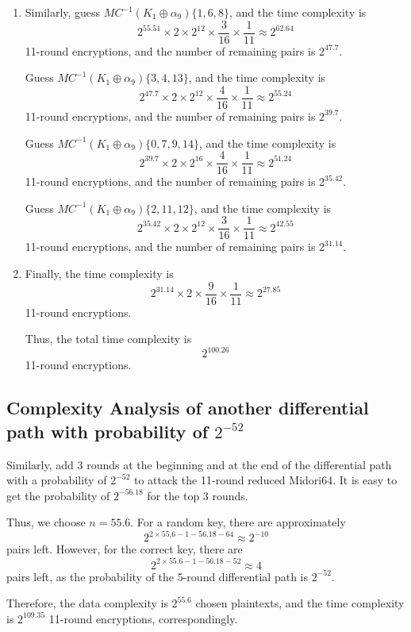 \documentclass[journal=tosc,preprint]{iacrtrans}
\begin{document}
\begin{enumerate}
        \item Similarly, guess $MC^{-1}(K_1 \oplus \alpha_9)\{1, 6, 8\}$, and the time complexity is
              \[
                  2^{55.51} \times 2 \times 2^{12} \times \frac{3}{16} \times \frac{1}{11} \approx 2^{62.64}
              \]
              11-round encryptions, and the number of remaining pairs is $2^{47.7}$.

              Guess $MC^{-1}(K_1 \oplus \alpha_9)\{3, 4, 13\}$, and the time complexity is
              \[
                  2^{47.7} \times 2 \times 2^{12} \times \frac{4}{16} \times \frac{1}{11} \approx 2^{55.24}
              \]
              11-round encryptions, and the number of remaining pairs is $2^{39.7}$.

              Guess $MC^{-1}(K_1 \oplus \alpha_9)\{0, 7, 9, 14\}$, and the time complexity is
              \[
                  2^{39.7} \times 2 \times 2^{16} \times \frac{4}{16} \times \frac{1}{11} \approx 2^{51.24}
              \]
              11-round encryptions, and the number of remaining pairs is $2^{35.42}$.

              Guess $MC^{-1}(K_1 \oplus \alpha_9)\{2, 11, 12\}$, and the time complexity is
              \[
                  2^{35.42} \times 2 \times 2^{12} \times \frac{3}{16} \times \frac{1}{11} \approx 2^{42.55}
              \]
              11-round encryptions, and the number of remaining pairs is $2^{31.14}$.

        \item Finally, the time complexity is
              \[
                  2^{31.14} \times 2 \times \frac{9}{16} \times \frac{1}{11} \approx 2^{27.85}
              \]
              11-round encryptions.

              Thus, the total time complexity is
              \[
                  2^{100.26}
              \]
              11-round encryptions.
    \end{enumerate}


    \subsection{Complexity Analysis of another differential path with probability of $2^{-52}$}

    Similarly, add 3 rounds at the beginning and at the end of the differential path with a probability of $2^{-52}$ to attack the 11-round reduced Midori64. It is easy to get the probability of $2^{-56.18}$ for the top 3 rounds.

    Thus, we choose $n = 55.6$. For a random key, there are approximately
    \[
        2^{2 \times 55.6 - 1 - 56.18 - 64} \approx 2^{-10}
    \]
    pairs left. However, for the correct key, there are
    \[
        2^{2 \times 55.6 - 1 - 56.18 - 52} \approx 4
    \]
    pairs left, as the probability of the 5-round differential path is $2^{-52}$.

    Therefore, the data complexity is $2^{55.6}$ chosen plaintexts, and the time complexity is $2^{109.35}$ 11-round encryptions, correspondingly.






\end{document}
